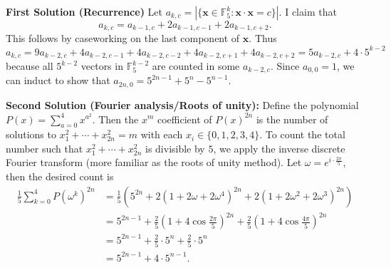\textbf{First Solution (Recurrence)} Let $a_{k,c}=|\{\mathbf{x}\in\mathbb{F}_5^k:\mathbf{x}\cdot\mathbf{x}=c\}|$. I claim that
\[
	a_{k,c}=a_{k-1,c}+2a_{k-1,c-1}+2a_{k-1,c+2}.
\]
This follows by caseworking on the last component of $\mathbf{x}$. Thus
\[
	a_{k,c}=9a_{k-2,c}+4a_{k-2,c-1}+4a_{k-2,c-2}+4a_{k-2,c+1}+4a_{k-2,c+2}=5a_{k-2,c}+4\cdot5^{k-2}
\]
because all $5^{k-2}$ vectors in $\mathbb{F}_5^{k-2}$ are counted in some $a_{k-2,c}$. Since $a_{0,0}=1$, we can induct to show that $a_{2n,0}=\boxed{5^{2n-1}+5^n-5^{n-1}}$.

\textbf{Second Solution (Fourier analysis/Roots of unity):} Define the polynomial $P(x)=\displaystyle\sum_{a=0}^4x^{a^2}$. Then the $x^m$ coefficient of $P(x)^{2n}$ is the number of solutions to $x_1^2+\cdots+x_{2n}^2=m$ with each $x_i\in\{0,1,2,3,4\}$. To count the total number such that $x_1^2+\cdots+x_{2n}^2$ is divisible by $5$, we apply the inverse discrete Fourier transform (more familiar as the roots of unity method). Let $\omega=e^{i\cdot\frac{2\pi}{5}}$, then the desired count is
\begin{align*}
	\frac{1}{5}\sum_{k=0}^4P(\omega^k)^{2n} &= \frac{1}{5}\left(5^{2n}+2(1+2\omega+2\omega^4)^{2n}+2(1+2\omega^2+2\omega^3)^{2n}\right) \\
	&= 5^{2n-1}+\frac{2}{5}(1+4\cos\frac{2\pi}{5})^{2n}+\frac{2}{5}(1+4\cos\frac{4\pi}{5})^{2n} \\
	&= 5^{2n-1}+\frac{2}{5}\cdot5^n+\frac{2}{5}\cdot5^n \\
	&= \boxed{5^{2n-1}+4\cdot5^{n-1}}.
\end{align*}